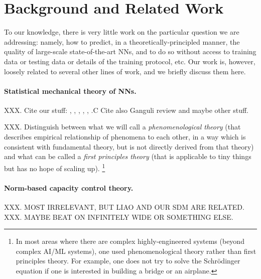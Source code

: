 \section{Background and Related Work}
\label{sxn:background}


To our knowledge, there is very little work on the particular question we are addressing: namely, how to predict, in a theoretically-principled manner, the quality of large-scale state-of-the-art NNs, and to do so without access to training data or testing data or details of the training protocol, etc.
Our work is, however, loosely related to several other lines of work, and we briefly discuss them here.

\paragraph{Statistical mechanical theory of NNs.}

XXX.
Cite our stuff:
\cite{MM17_TR},
\cite{MM18_TR},
\cite{MM19_HTSR_ICML},
\cite{weightwatcher_package}
\cite{MM19_KDD},
\cite{MM20_SDM},
\cite{MM20_unpub_work}.C
Cite also Ganguli review and maybe other stuff.

XXX.
Distinguish between what we will call a
\emph{phenomenological theory}
(that describes empirical relationship of phenomena to each other, in a way which is consistent with fundamental theory, but is not directly derived from that theory)
and what can be called a 
\emph{first principles theory} 
(that is applicable to tiny things but has no hope of scaling up).
\footnote{In most areas where there are complex highly-engineered systems (beyond complex AI/ML systems), one used phenomenological theory rather than first principles theory.  For example, one does not try to solve the Schr\"odinger equation if one is interested in building a bridge or an airplane.}

\paragraph{Norm-based capacity control theory.}
XXX.  MOST IRRELEVANT, BUT LIAO AND OUR SDM ARE RELATED.  
XXX.  MAYBE BEAT ON INFINITELY WIDE OR SOMETHING ELSE.


